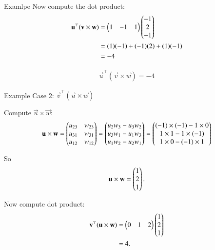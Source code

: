 \documentclass{beamer}
\begin{document}
\begin{frame}{Examlpe}
Now compute the dot product:
\begin{align}
\mathbf{u} ^\top (\mathbf{v}\times \mathbf{w}) &= \begin{pmatrix}1 & -1 & 1\end{pmatrix}\begin{pmatrix}-1 \\ 2 \\ -1\end{pmatrix} \\
&= (1)(-1) + (-1)(2) + (1)(-1) \\
&= -4
\end{align}

\begin{align}
\boxed{\vec{u}^\top(\vec{v}\times \vec{w}) = -4}
\end{align}
\end{frame}

\begin{frame}{Example}
    Case 2: $\vec{v} ^\top (\vec{u} \times \vec{w})$

Compute $\vec{u} \times \vec{w}$:
\begin{align}
\mathbf{u} \times \mathbf{w} =
\begin{pmatrix}
u_{23} & w_{23} \\
u_{31} & w_{31} \\
u_{12} & w_{12}
\end{pmatrix}
=
\begin{pmatrix}
u_2 w_3 - u_3 w_2 \\
u_3 w_1 - u_1 w_3 \\
u_1 w_2 - u_2 w_1
\end{pmatrix}
=
\begin{pmatrix}
(-1) \times (-1) - 1 \times 0 \\
1 \times 1 - 1 \times (-1) \\
1 \times 0 - (-1) \times 1
\end{pmatrix}
\end{align}

So
\begin{align}
\mathbf{u}\times \mathbf{w} = \begin{pmatrix}1 \\ 2 \\ 1\end{pmatrix}.
\end{align}

Now compute dot product:
\begin{align}
\mathbf{v}^\top(\mathbf{u}\times \mathbf{w}) &= \begin{pmatrix}0 & 1 & 2\end{pmatrix}\begin{pmatrix}1 \\ 2 \\ 1\end{pmatrix} \\ 
&= 4.
\end{align}
\end{frame}
\end{document}
